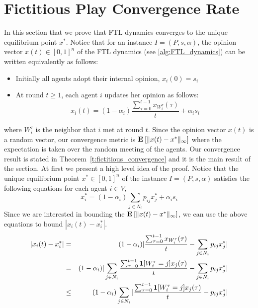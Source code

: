 \section{Fictitious Play Convergence Rate}\label{s:fictitious_convergence}
In this section that we prove that FTL dynamics
converges to the unique equilibrium point $x^*$.
Notice that for an instance $I=(P,s,\alpha)$, the opinion vector $x(t) \in [0,1]^n$
of the FTL dynamics (see \ref{alg:FTL_dynamics}) can be written equivalently as follows:
\begin{itemize}
 \item Initially all agents adopt their internal opinion, $x_i(0)=s_i$
 \item At round $t \geq 1$, each agent $i$ updates her opinion as follows:
 \begin{equation}
x_i(t)=(1-\alpha_i)\frac{\sum_{\tau=0}^{t-1} x_{W_i^\tau}(\tau)}{t}+ \alpha_i s_i\end{equation}
\end{itemize}
where $W_i^\tau$ is the neighbor that $i$ met at round $t$. 
Since the opinion vector $x(t)$ is a random vector,
our convergence metric is $\bm{\mathrm{E}}_{} \left[ \| x(t) - x^* \|_{\infty} \right]$
where the expectation is taken over the random meeting of the agents.
Our convergence result is stated in Theorem~\ref{t:fictitious_convergence}
and it is the main result of the section.
%
%
\noindent At first we present a high level idea of the proof. 
Notice that the unique equilibrium point $x^* \in [0,1]^n$ of the 
instance $I=(P,s,\alpha)$ satisfies the following equations
for each agent $i \in V$,
\[x_i^*= (1-\alpha_i)\sum_{j \in N_i}p_{ij}x_j^* + \alpha_is_i\]
Since we are interested in bounding the $\bm{\mathrm{E}}_{} \left[ \| x(t)-x^* \|_{\infty} \right]$, we
can use the above equations to bound $|x_i(t)-x_i^*|$.
\begin{eqnarray*}
 |x_i(t)-x_i^*|
 &=& (1-\alpha_i)|\frac{\sum_{\tau=0}^{t-1} x_{W_i^\tau}(\tau)}{t}
 - \sum_{j \in N_i} p_{ij}x_j^*|\\
 &=& (1-\alpha_i)|\sum_{j \in N_i}\frac{\sum_{\tau=0}^{t-1} \bm{1}{\left[W_i^\tau=j\right]}x_j(\tau)}{t}-\sum_{j \in N_i} p_{ij}x_j^*|\\
 &\leq& (1-\alpha_i)\sum_{j \in N_i}|\frac{\sum_{\tau=0}^{t-1} \bm{1}{\left[W_i^\tau=j\right]}x_j(\tau)}{t}- p_{ij}x_j^*|
\end{eqnarray*}
